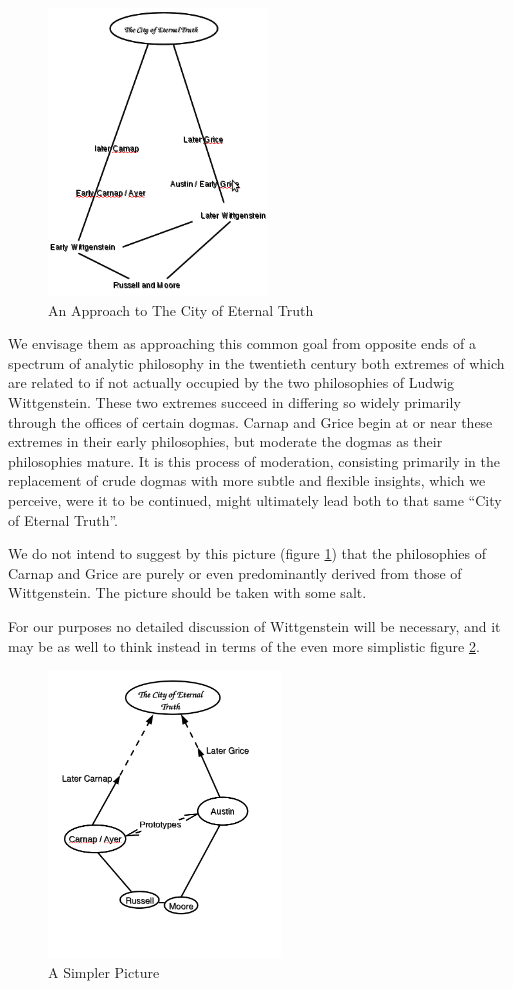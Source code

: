 \documentclass[10pt,titlepage]{book}
\begin{document}
\begin{figure}
\centering
\includegraphics[height=3in]{p008a.png}
\caption{An Approach to The City of Eternal Truth \label{ApproachToCity}}
\end{figure}



We envisage them as approaching this common goal from opposite ends of a spectrum of analytic philosophy in the twentieth century both extremes of which are related to if not actually occupied by the two philosophies of Ludwig Wittgenstein.
These two extremes succeed in differing so widely primarily through the offices of certain dogmas.
Carnap and Grice begin at or near these extremes in their early philosophies, but moderate the dogmas as their philosophies mature.
It is this process of moderation, consisting primarily in the replacement of crude dogmas with more subtle and flexible insights, which we perceive, were it to be continued, might ultimately lead both to that same ``City of Eternal Truth''.

We do not intend to suggest by this picture (figure \ref{ApproachToCity}) that the philosophies of Carnap and Grice are purely or even predominantly derived from those of Wittgenstein.
The picture should be taken with some salt.

For our purposes no detailed discussion of Wittgenstein will be necessary, and it may be as well to think instead in terms of the even more simplistic figure \ref{Simpler Approach}.

\begin{figure}
\centering
\includegraphics[height=3in]{p008b.png}
\caption{A Simpler Picture \label{Simpler Approach}}
\end{figure}
\end{document}
